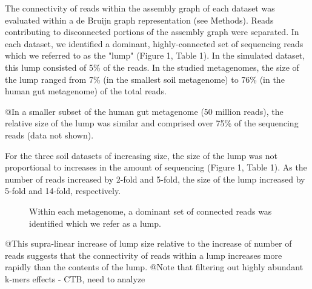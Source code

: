 \documentclass[11pt]{article} %
\begin{document}
The connectivity of reads within the assembly graph of each dataset was evaluated within a de Bruijn graph representation (see Methods).  Reads contributing to disconnected portions of the assembly graph were separated.  In each dataset, we identified a dominant, highly-connected set of sequencing reads which we referred to as the "lump" (Figure 1, Table 1).  In the simulated dataset, this lump consisted of 5\% of the reads.  In the studied metagenomes, the size of the lump ranged from 7\% (in the smallest soil metagenome) to 76\% (in the human gut metagenome) of the total reads.  

@In a smaller subset of the human gut metagenome (50 million reads), the relative size of the lump was similar and comprised over 75\% of the sequencing reads (data not shown).  

For the three soil datasets of increasing size, the size of the lump was not proportional to increases in the amount of sequencing (Figure 1, Table 1).  As the number of reads increased by 2-fold and 5-fold, the size of the lump increased by 5-fold and 14-fold, respectively.  

\begin{figure}
\caption{Within each metagenome, a dominant set of connected reads was identified which we refer as a lump.}
\end{figure}


@This supra-linear increase of lump size relative to the increase of number of reads suggests that the connectivity of reads within a lump increases more rapidly than the contents of the lump.  
@Note that filtering out highly abundant k-mers effects - CTB, need to analyze
\end{document}
